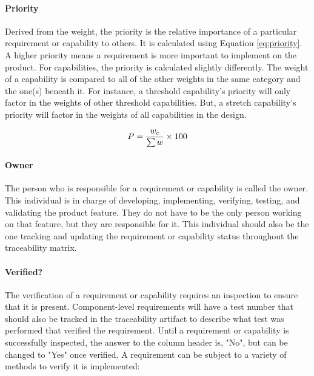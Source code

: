 \paragraph*{Priority} Derived from the weight, the priority is the relative importance of a particular requirement or capability to others.
It is calculated using Equation \ref{eq:priority}. 
A higher priority means a requirement is more important to implement on the product.
For capabilities, the priority is calculated slightly differently.
The weight of a capability is compared to all of the other weights in the same category and the one(s) beneath it.
For instance, a threshold capability's priority will only factor in the weights of other threshold capabilities.
But, a stretch capability's priority will factor in the weights of all capabilities in the design.

\begin{equation} \labeq{priority}
    P = \frac{w_c}{\sum w} \times 100
\end{equation}

\paragraph*{Owner} The person who is responsible for a requirement or capability is called the owner.
This individual is in charge of developing, implementing, verifying, testing, and validating the product feature.
They do not have to be the only person working on that feature, but they are responsible for it.
This individual should also be the one tracking and updating the requirement or capability status throughout the traceability matrix. 

\paragraph*{Verified?} The verification of a requirement or capability requires an inspection to ensure that it is present.
Component-level requirements will have a test number that should also be tracked in the traceability artifact to describe what test was performed that verified the requirement.
Until a requirement or capability is successfully inspected, the answer to the column header is, "No", but can be changed to "Yes" once verified.
A requirement can be subject to a variety of methods to verify it is implemented:

